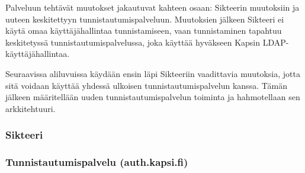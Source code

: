 Palveluun tehtävät muutokset jakautuvat kahteen osaan: Sikteerin muutoksiin ja uuteen keskitettyyn tunnistautumispalveluun. Muutoksien jälkeen Sikteeri ei käytä omaa käyttäjähallintaa tunnistamiseen, vaan tunnistaminen tapahtuu keskitetyssä tunnistautumispalvelussa, joka käyttää hyväkseen Kapsin LDAP-käyttäjähallintaa.

Seuraavissa aliluvuissa käydään ensin läpi Sikteeriin vaadittavia muutoksia, jotta sitä voidaan käyttää yhdessä ulkoisen tunnistautumispalvelun kanssa. Tämän jälkeen määritellään uuden tunnistautumispalvelun toiminta ja hahmotellaan sen arkkitehtuuri.

\subsubsection{Sikteeri}

\subsubsection{Tunnistautumispalvelu (auth.kapsi.fi)}
